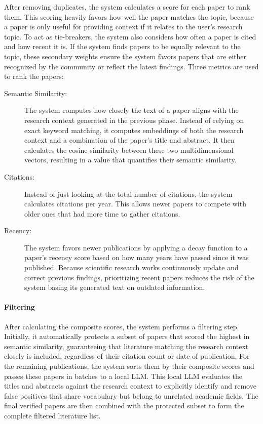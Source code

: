 After removing duplicates, the system calculates a score for each paper to rank them. 
This scoring heavily favors how well the paper matches the topic, because a paper is only useful for providing context if it relates to the user's research topic. 
To act as tie-breakers, the system also considers how often a paper is cited and how recent it is. 
If the system finds papers to be equally relevant to the topic, these secondary weights ensure the system favors papers that are either recognized by the community or reflect the latest findings.
Three metrics are used to rank the papers:
\begin{description}
    \item[Semantic Similarity:] The system computes how closely the text of a paper aligns with the research context generated in the previous phase. 
    Instead of relying on exact keyword matching, it computes embeddings of both the research context and a combination of the paper's title and abstract. 
    It then calculates the cosine similarity between these two multidimensional vectors, resulting in a value that quantifies their semantic similarity.
    \item[Citations:] Instead of just looking at the total number of citations, the system calculates citations per year. This allows newer papers to compete with older ones that had more time to gather citations.
    \item[Recency:] The system favors newer publications by applying a decay function to a paper's recency score based on how many years have passed since it was published. Because scientific research works continuously update and correct previous findings, prioritizing recent papers reduces the risk of the system basing its generated text on outdated information.
\end{description}

\paragraph{Filtering}
After calculating the composite scores, the system performs a filtering step.
Initially, it automatically protects a subset of papers that scored the highest in semantic similarity, guaranteeing that literature matching the research context closely is included, regardless of their citation count or date of publication.
For the remaining publications, the system sorts them by their composite scores and passes these papers in batches to a local LLM.
This local LLM evaluates the titles and abstracts against the research context to explicitly identify and remove false positives that share vocabulary but belong to unrelated academic fields.
The final verified papers are then combined with the protected subset to form the complete filtered literature list.

